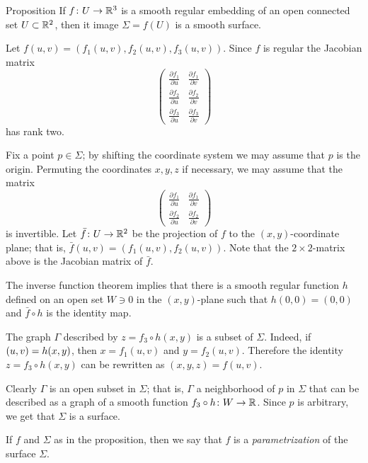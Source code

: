 \begin{thm}{Proposition}\label{prop:graph-chart}
If $f\colon U\to \mathbb{R}^3$ is a smooth regular embedding of an open connected set $U\subset \mathbb{R}^2$, then it image $\Sigma=f(U)$ is a smooth surface.
\end{thm}

Let $f(u,v)=(f_1(u,v),f_2(u,v),f_3(u,v))$.
Since $f$ is regular the Jacobian matrix
\[
\renewcommand\arraystretch{1.3}
\begin{pmatrix}
\tfrac{\partial f_1}{\partial u}&\tfrac{\partial f_1}{\partial v}\\
\tfrac{\partial f_2}{\partial u}&\tfrac{\partial f_2}{\partial v}\\
\tfrac{\partial f_3}{\partial u}&\tfrac{\partial f_3}{\partial v}
\end{pmatrix}
\]
has rank two.

Fix a point $p\in \Sigma$; by shifting the coordinate system we may assume that $p$ is the origin.
Permuting the coordinates $x,y,z$ if necessary, we may assume that 
the matrix 
\[
\renewcommand\arraystretch{1.3}
\begin{pmatrix}
\tfrac{\partial f_1}{\partial u}&\tfrac{\partial f_1}{\partial v}\\
\tfrac{\partial f_2}{\partial u}&\tfrac{\partial f_2}{\partial v}
\end{pmatrix}
\]
is invertible.
Let $\bar f\colon U\to\mathbb{R}^2$ be the projection of $f$ to the $(x,y)$-coordinate plane;
that is, $\bar f(u,v)=(f_1(u,v),f_2(u,v))$.
Note that the $2\times2$-matrix above is the Jacobian matrix of $\bar f$.

The inverse function theorem implies that there is a smooth regular function $h$ defined on an open set $W\ni 0$ in the $(x,y)$-plane
such that $h(0,0)=(0,0)$ and $\bar f\circ h$ is the identity map.

The graph $\Gamma$ described by $z=f_3\circ h(x,y)$ is a subset of $\Sigma$.
Indeed, if $(u,v)\z=h(x,y)$, then $x=f_1(u,v)$ and $y=f_2(u,v)$.
Therefore the identity $z=f_3\circ h(x,y)$ can be rewritten as $(x,y,z)=f(u,v)$.

Clearly $\Gamma$ is an open subset in $\Sigma$;
that is, $\Gamma$ a neighborhood of $p$ in $\Sigma$ that can be described as a graph of a smooth function $f_3\circ h\colon W\to\mathbb{R}$.
Since $p$ is arbitrary, we get that $\Sigma$ is a surface.
\qeds

If $f$ and $\Sigma$ as in the proposition, then we say that $f$ is a \emph{parametrization} of the surface $\Sigma$. 


